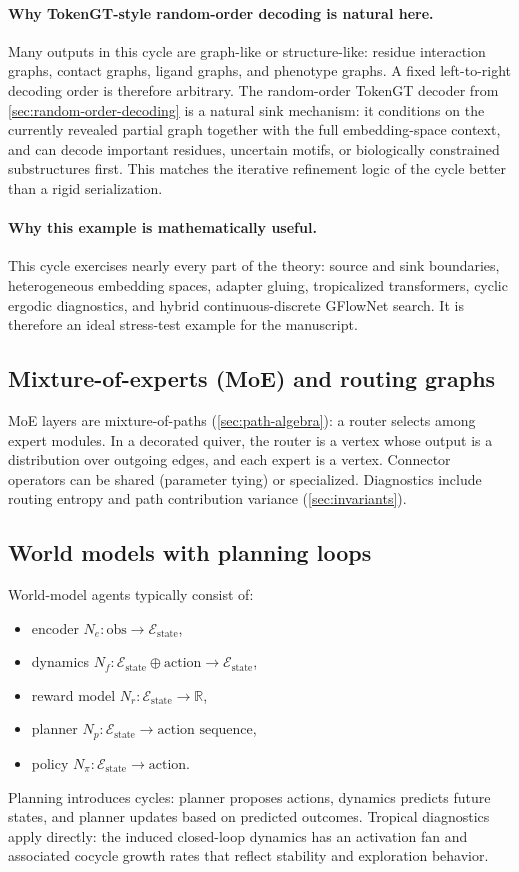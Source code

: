 \documentclass[11pt]{article}
\theoremstyle{definition}
\theoremstyle{plain}
\theoremstyle{remark}
\newcommand{\R}{\mathbb{R}}
\newcommand{\mc}[1]{\mathcal{#1}}
\newcommand{\Emb}{\mc{E}}
\begin{document}
\paragraph{Why TokenGT-style random-order decoding is natural here.}
Many outputs in this cycle are graph-like or structure-like:
residue interaction graphs, contact graphs, ligand graphs, and phenotype graphs.
A fixed left-to-right decoding order is therefore arbitrary.
The random-order TokenGT decoder from \cref{sec:random-order-decoding} is a natural sink mechanism:
it conditions on the currently revealed partial graph together with the full embedding-space context, and can decode important residues, uncertain motifs, or biologically constrained substructures first.
This matches the iterative refinement logic of the cycle better than a rigid serialization.

\paragraph{Why this example is mathematically useful.}
This cycle exercises nearly every part of the theory:
source and sink boundaries, heterogeneous embedding spaces, adapter gluing, tropicalized transformers, cyclic ergodic diagnostics, and hybrid continuous-discrete GFlowNet search.
It is therefore an ideal stress-test example for the manuscript.



\subsection{Mixture-of-experts (MoE) and routing graphs}
MoE layers are mixture-of-paths (\cref{sec:path-algebra}): a router selects among expert modules.
In a decorated quiver, the router is a vertex whose output is a distribution over outgoing edges, and each expert is a vertex.
Connector operators can be shared (parameter tying) or specialized.
Diagnostics include routing entropy and path contribution variance (\cref{sec:invariants}).

\subsection{World models with planning loops}
World-model agents typically consist of:
\begin{itemize}[leftmargin=2em]
\item encoder $N_e:\text{obs}\to \Emb_{\text{state}}$,
\item dynamics $N_f:\Emb_{\text{state}}\oplus \text{action}\to \Emb_{\text{state}}$,
\item reward model $N_r:\Emb_{\text{state}}\to \R$,
\item planner $N_p:\Emb_{\text{state}}\to \text{action sequence}$,
\item policy $N_\pi:\Emb_{\text{state}}\to \text{action}$.
\end{itemize}
Planning introduces cycles: planner proposes actions, dynamics predicts future states, and planner updates based on predicted outcomes.
Tropical diagnostics apply directly: the induced closed-loop dynamics has an activation fan and associated cocycle growth rates that reflect stability and exploration behavior.
\end{document}
